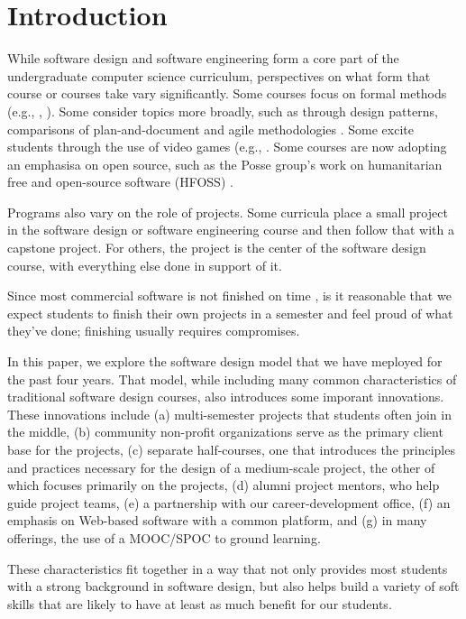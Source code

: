 \section{Introduction}

While software design and software engineering form a core part of
the undergraduate computer science curriculum, perspectives on what
form that course or courses take vary significantly.  Some courses
focus on formal methods (e.g., \cite{liu-2009}, \cite{gracia-2014}).
Some consider topics more broadly, such as through design patterns,
comparisons of plan-and-document and agile methodologies
\cite{gestwicki-2018}.  Some excite students through the use of
video games (e.g., \cite{wolz-2007}.  Some courses are now adopting
an emphasisa on open source, such as the Posse group's work on
humanitarian free and open-source software (HFOSS) \cite{hfoss-2018}.

Programs also vary on the role of projects.  Some curricula place
a small project in the software design or software engineering
course and then follow that with a capstone project.  For others,
the project is the center of the software design course, with
everything else done in support of it.

Since most commercial software is not finished on time \cite{fox-2014},
is it reasonable that we expect students to finish their own projects
in a semester and feel proud of what they've done; finishing usually
requires compromises.

In this paper, we explore the software design model that we have
meployed for the past four years.  That model, while including many
common characteristics of traditional software design courses, also
introduces some imporant innovations.  These innovations include
(a) multi-semester projects that students often join in the middle,
(b) community non-profit organizations serve as the primary client
base for the projects, (c) separate half-courses, one that introduces
the principles and practices necessary for the design of a medium-scale
project, the other of which focuses primarily on the projects, (d)
alumni project mentors, who help guide project teams, (e) a partnership
with our career-development office, (f) an emphasis on Web-based
software with a common platform, and (g) in many offerings, the use
of a MOOC/SPOC to ground learning.

These characteristics fit together in a way that not only provides
most students with a strong background in software design, but also
helps build a variety of soft skills that are likely to have at
least as much benefit for our students.

